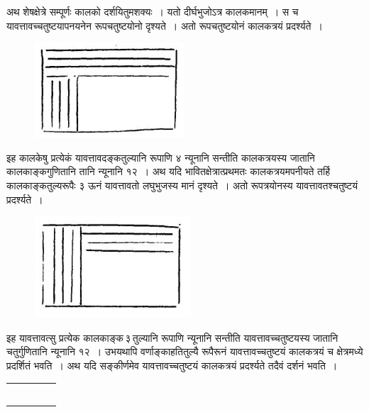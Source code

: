 \documentclass[11pt, openany]{book}
\begin{document}
 अथ शेषक्षेत्रे सम्पूर्णः कालको दर्शयितुमशक्यः~। यतो दीर्घभुजोऽत्र कालकमानम्~। स च यावत्तावच्चतुष्टयापनयनेन रूपचतुष्टयोनो दृश्यते~। अतो
रूपचतुष्टयोनं
कालकत्रयं प्रदर्श्यते~।
\vspace{-2mm}

\begin{figure}[h!]
    \centering
    \includegraphics[scale=0.7]{graphics/Capture20.png}
\end{figure}
\vspace{-2mm}

 इह कालकेषु प्रत्येकं यावत्तावदङ्कतुल्यानि रूपाणि ४ न्यूनानि सन्तीति
कालकत्रयस्य जातानि कालकाङ्कगुणितानि तानि न्यूनानि १२~। अथ यदि
भावितक्षेत्रात्प्रथमतः कालकत्रयमपनीयते तर्हि कालकाङ्कतुल्यरूपैः ३ ऊनं यावत्तावतो
लघुभुजस्य मानं दृश्यते~। अतो रूपत्रयोनस्य यावत्तावतश्चतुष्टयं प्रदर्श्यते~।
\vspace{-2mm}

\begin{figure}[h!]
    \centering
    \includegraphics[scale=0.7]{graphics/Capture21.png}
\end{figure}
\newpage
 इह यावत्तावत्सु प्रत्येक कालकाङ्क\textendash \,३\textendash \,तुल्यानि रूपाणि न्यूनानि सन्तीति
यावत्तावच्चतुष्टयस्य जातानि चतुर्गुणितानि न्यूनानि १२~। उभयथापि
वर्णाङ्काहतितुल्यै रूपैरूनं यावत्तावच्चतुष्टयं कालकत्रयं च क्षेत्रमध्ये प्रदर्शितं
भवति~। अथ
यदि सङ्कीर्णमेव यावत्तावच्चतुष्टयं कालकत्रयं प्रदर्श्यते तदैवं दर्शनं
भवति~।
\begin{table}[h!]
  \centering\renewcommand{\arraystretch}{0.8}
\begin{tabular}{|l|l|l|l|p{2.5cm}|}
\hline
 &  &  &  &  \\ \hline
 &  &  &  &  \\ \hline
 &  &  &  &  \\ \hline
 &  &  &  &  \\ 
 &  &  &  &  \\ 
 &  &  &  &  \\ 
  &  &  &  &  \\ \hline
\end{tabular}
\end{table}
\end{document}
